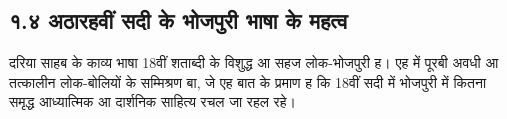\subsection*{१.४ अठारहवीं सदी के भोजपुरी भाषा के महत्व}

दरिया साहब के काव्य भाषा 18वीं शताब्दी के विशुद्ध आ सहज लोक-भोजपुरी ह। एह में पूरबी अवधी आ तत्कालीन लोक-बोलियों के सम्मिश्रण बा, जे एह बात के प्रमाण ह कि 18वीं सदी में भोजपुरी में कितना समृद्ध आध्यात्मिक आ दार्शनिक साहित्य रचल जा रहल रहे।
